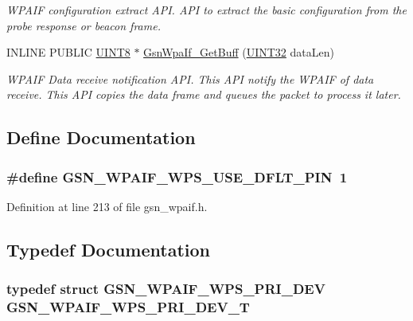 \begin{DoxyCompactItemize}
\begin{DoxyCompactList}\small\item\em WPAIF configuration extract API. API to extract the basic configuration from the probe response or beacon frame. \end{DoxyCompactList}\item 
INLINE PUBLIC \hyperlink{a00660_gab27e9918b538ce9d8ca692479b375b6a}{UINT8} $\ast$ \hyperlink{a00687_gae1ac16436501065ce3743135464cacb2}{GsnWpaIf\_\-GetBuff} (\hyperlink{a00660_gae1e6edbbc26d6fbc71a90190d0266018}{UINT32} dataLen)
\begin{DoxyCompactList}\small\item\em WPAIF Data receive notification API. This API notify the WPAIF of data receive. This API copies the data frame and queues the packet to process it later. \end{DoxyCompactList}\end{DoxyCompactItemize}


\subsection{Define Documentation}
\hypertarget{a00615_a30cd731d42e99f100b546b0674155194}{
\subsubsection[{GSN\_\-WPAIF\_\-WPS\_\-USE\_\-DFLT\_\-PIN}]{\setlength{\rightskip}{0pt plus 5cm}\#define GSN\_\-WPAIF\_\-WPS\_\-USE\_\-DFLT\_\-PIN~1}}
\label{a00615_a30cd731d42e99f100b546b0674155194}


Definition at line 213 of file gsn\_\-wpaif.h.



\subsection{Typedef Documentation}
\hypertarget{a00615_a838653f59da3271c858246150315a7b0}{
\subsubsection[{GSN\_\-WPAIF\_\-WPS\_\-PRI\_\-DEV\_\-T}]{\setlength{\rightskip}{0pt plus 5cm}typedef struct {\bf GSN\_\-WPAIF\_\-WPS\_\-PRI\_\-DEV} {\bf GSN\_\-WPAIF\_\-WPS\_\-PRI\_\-DEV\_\-T}}}
\label{a00615_a838653f59da3271c858246150315a7b0}
